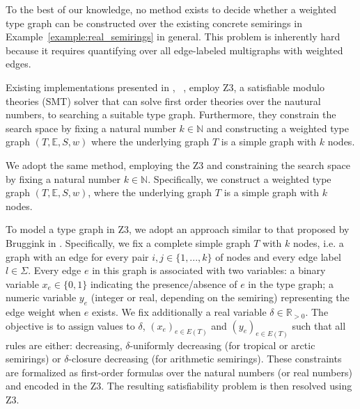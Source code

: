 To the best of our knowledge, no method exists to decide whether a weighted type graph can be constructed over the existing concrete semirings in  Example~\ref{example:real_semirings} in general. 
This problem is inherently hard because it requires quantifying over all edge-labeled multigraphs with weighted edges.

Existing implementations presented in \cite[]{bruggink2015proving}, ~\cite[]{zantema2014termination}, \cite[\textsection E]{endrullis2024generalized} employ Z3, a satisfiable modulo theories (SMT) solver that can solve first order theories over the nautural numbers, to searching a suitable type graph.
Furthermore, they constrain the search space by fixing a natural number
\( k \in \mathbb{N} \) and constructing a weighted type graph \((T, \mathbb{E}, S, w)\) where the underlying graph \( T \) is a simple graph with \( k \) nodes.

We adopt the same method, employing the Z3 and constraining the search space by fixing a natural number \( k \in \mathbb{N} \). Specifically, we construct a weighted type graph \((T, \mathbb{E}, S, w)\), where the underlying graph \( T \) is a simple graph with \( k \) nodes.

To model a type graph in Z3, we adopt an approach similar to that proposed by Bruggink in \cite[]{bruggink2015proving}.
Specifically, we fix a complete simple graph $T$ with $k$ nodes, i.e. a graph with an edge for every pair $i,j\in\{1,...,k\}$ of nodes and every edge label $l \in \Sigma$. 
Every edge $e$ in this graph is associated with two variables:
a binary variable \( x_e \in \{0,1\} \) indicating the presence/absence of \( e \) in the type graph;
a numeric variable \( y_e \) (integer or real, depending on the semiring) representing the edge weight when \( e \) exists.  
We fix additionally a real variable $\delta \in \mathbb{R}_{>0}$.
The objective is to assign values to $\delta$, \( (x_e)_{e \in E(T)} \) and \( (y_e)_{e \in E(T)} \) such that all rules are either: decreasing, $\delta$-uniformly decreasing (for tropical or arctic semirings) or \(\delta\)-closure decreasing (for arithmetic semirings).  
These constraints are formalized as first-order formulas over the natural numbers (or real numbers) and encoded in the Z3. The resulting satisfiability problem is then resolved using Z3.

